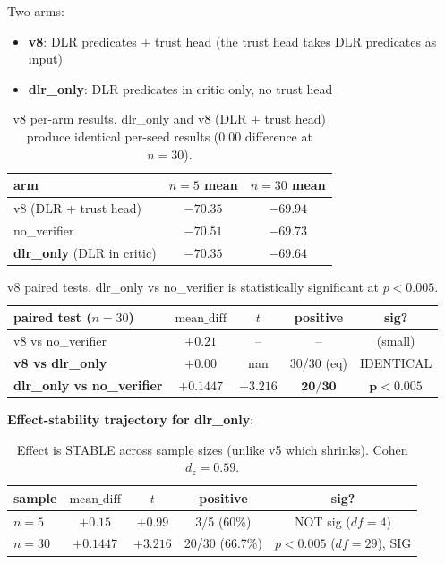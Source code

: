 \documentclass[11pt]{article}
\begin{document}
Two arms:
\begin{itemize}
  \item \textbf{v8}: DLR predicates + trust head (the trust head
        takes DLR predicates as input)
  \item \textbf{dlr\_only}: DLR predicates in critic only, no trust
        head
\end{itemize}

\begin{table}[h]
\centering
\begin{tabular}{lcc}
\toprule
arm & $n=5$ mean & $n=30$ mean \\
\midrule
v8 (DLR + trust head)    & $-70.35$ & $-69.94$ \\
no\_verifier              & $-70.51$ & $-69.73$ \\
\textbf{dlr\_only} (DLR in critic) & $\mathbf{-70.35}$ & $\mathbf{-69.64}$ \\
\bottomrule
\end{tabular}
\caption{v8 per-arm results. dlr\_only and v8 (DLR + trust head)
produce identical per-seed results (0.00 difference at $n=30$).
}
\end{table}

\begin{table}[h]
\centering
\begin{tabular}{lcccc}
\toprule
paired test ($n=30$) & $\text{mean\_diff}$ & $t$ & positive & sig? \\
\midrule
v8 vs no\_verifier & $+0.21$ & -- & -- & (small) \\
\textbf{v8 vs dlr\_only} & $\mathbf{+0.00}$ & nan & 30/30 (eq) & IDENTICAL \\
\textbf{dlr\_only vs no\_verifier} & $\mathbf{+0.1447}$ & $\mathbf{+3.216}$ & $\mathbf{20/30}$ & $\mathbf{p<0.005}$ \\
\bottomrule
\end{tabular}
\caption{v8 paired tests. dlr\_only vs no\_verifier is statistically
significant at $p<0.005$.}
\end{table}

\textbf{Effect-stability trajectory for dlr\_only}:
\begin{table}[h]
\centering
\begin{tabular}{lcccc}
\toprule
sample & $\text{mean\_diff}$ & $t$ & positive & sig? \\
\midrule
$n=5$ & $+0.15$ & $+0.99$ & 3/5 (60\%) & NOT sig ($df=4$) \\
$n=30$ & $+0.1447$ & $+3.216$ & 20/30 (66.7\%) & $p<0.005$ ($df=29$), SIG \\
\bottomrule
\end{tabular}
\caption{Effect is STABLE across sample sizes (unlike v5 which
shrinks). Cohen $d_z = 0.59$.}
\end{table}
\end{document}

